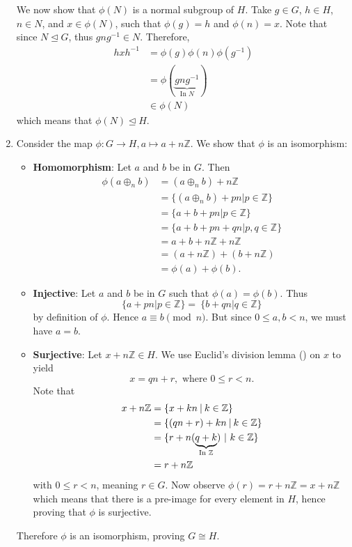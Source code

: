 \begin{enumerate}
    We now show that $\phi(N)$ is a normal subgroup of $H$. Take $g \in G$, $h \in H$, $n \in N$, and $x \in \phi(N)$, such that $\phi(g) = h$ and $\phi(n) = x$. Note that since $N \unlhd G$, thus $gng^{-1} \in N$. Therefore,
    \begin{align*}
        hxh^{-1} &= \phi(g)\phi(n)\phi(g^{-1})\\
        &= \phi(\underbrace{gng^{-1}}_{\text{In }N})\\
        &\in \phi(N)
    \end{align*}
    which means that $\phi(N) \unlhd H$.

    \item Consider the map $\phi: G \to H, a \mapsto a + n\mathbb{Z}$. We show that $\phi$ is an isomorphism:
    \begin{itemize}
        \item \textbf{Homomorphism}: Let $a$ and $b$ be in $G$. Then
        \begin{align*}
            \phi(a\oplus_n b) &= (a\oplus_n b) + n\mathbb{Z}\\
            &= \{(a \oplus_n b) + pn \vert p \in \mathbb{Z}\}\\
            &= \{a+b + pn \vert p \in \mathbb{Z}\}\\
            &= \{a+b + pn + qn\vert p, q \in \mathbb{Z}\}\\
            &= a+b+n\mathbb{Z} + n\mathbb{Z}\\
            &= (a+n\mathbb{Z}) + (b + n\mathbb{Z})\\
            &= \phi(a) + \phi(b).
        \end{align*}
        \item \textbf{Injective}: Let $a$ and $b$ be in $G$ such that $\phi(a) = \phi(b)$. Thus
        \[
            \{a + pn \vert p \in \mathbb{Z} \} = \ \{b + qn \vert q \in \mathbb{Z} \}
        \]
        by definition of $\phi$. Hence $a \equiv b \pmod n$. But since $0 \leq a, b < n$, we must have $a = b$.
        \item \textbf{Surjective}: Let $x + n\mathbb{Z} \in H$. We use Euclid's division lemma () on $x$ to yield
        \[
            x = qn + r, \text{ where } 0 \leq r < n.
        \]
        Note that
        \begin{align*}
            x + n\mathbb{Z} &= \{x + kn \vert k \in \mathbb{Z}\}\\
            &= \{(qn + r) + kn \vert k \in \mathbb{Z}\}\\
            &= \{r + n(\underbrace{q + k}_{\text{In }\mathbb{Z}}) \vertalt k \in \mathbb{Z} \}\\
            &= r + n\mathbb{Z}
        \end{align*}
        with $0 \leq r < n$, meaning $r \in G$. Now observe $\phi(r) = r+n\mathbb{Z} = x+n\mathbb{Z}$ which means that there is a pre-image for every element in $H$, hence proving that $\phi$ is surjective.
    \end{itemize}
    Therefore $\phi$ is an isomorphism, proving $G \cong H$.
    

\end{enumerate}
